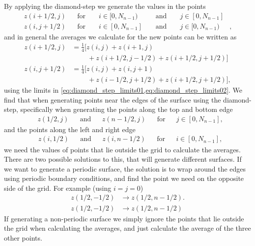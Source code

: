 By applying the diamond-step we generate the values in the points
\begin{align}
    z(i+1/2, j) & &\text{for } & &i\in [0,N_{n-1}) & &\text{ and } & &j\in [0,N_{n-1}]& \label{eq:diamond_step_limits01} \\
    z(i, j+1/2) & &\text{for } & &i\in [0,N_{n-1}] & &\text{ and } & &j\in [0,N_{n-1})&, \label{eq:diamond_step_limits02}
\end{align}
and in general the averages we calculate for the new points can be written as
\begin{align}
    z(i+1/2, j) 
    &= 
    \frac{1}{4}\Big[
        z(i, j) + z(i+1, j) \nonumber\\
        &\phantom{=\Big[}~~~%
            + z(i+1/2, j-1/2) + z(i+1/2, j+1/2)
    \Big]
    \label{eq:diamond_step01}\\
    z(i, j+1/2) 
    &= 
    \frac{1}{4}\Big[
        z(i,j) + z(i, j+1) \nonumber\\
        &\phantom{=\Big[}~~~%
            + z(i-1/2, j+1/2) + z(i+1/2, j+1/2)
    \Big],
    \label{eq:diamond_step02}
\end{align}
using the limits in \cref{eq:diamond_step_limits01,eq:diamond_step_limits02}. We find that when generating points near the edges of the surface using the diamond-step, specifically when generating the points along the top and bottom edge%
%
\begin{align*} %
    &z(1/2, j) & &\text{and} & &z(n - 1/2, j) & &\text{for} & &j \in [0, N_{n-1}],
\end{align*}
and the points along the left and right edge
\begin{align*}
    &z(i, 1/2) & &\text{and} & &z(i, n - 1/2) & &\text{for} & &i \in [0, N_{n-1}],
\end{align*}
we need the values of points that lie outside the grid to calculate the averages. There are two possible solutions to this, that will generate different surfaces. If  we want to generate a periodic surface, the solution is to wrap around the edges using periodic boundary conditions, and find the point we need on the opposite side of the grid. For example (using $i = j = 0$)
\begin{align*}
    z(1/2, -1/2) &\rightarrow z(1/2, n-1/2). \\
    z(1/2, -1/2) &\rightarrow z(1/2, n-1/2)
\end{align*}
If generating a non-periodic surface we simply ignore the points that lie outside the grid when calculating the averages, and just calculate the average of the three other points.